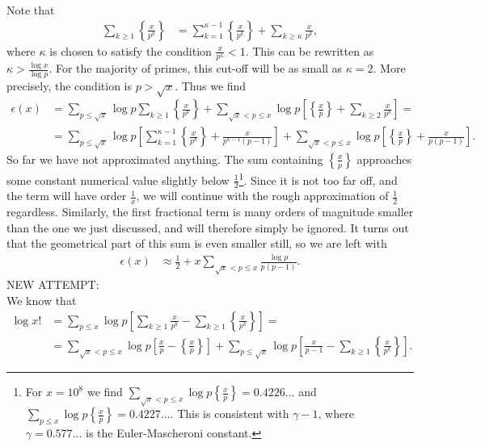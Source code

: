 \documentclass[english, parskip=full]{scrartcl}
\newcommand{\klam}{}
\newcommand{\klammer}{}
\begin{document}
Note that
\begin{align}
\sum_{k\ge 1} \klammer\left\{ \frac{x}{p^k} \right\} &= \sum_{k = 1}^{\kappa-1} \klammer\left\{ \frac{x}{p^k} \right\} + \sum_{k\ge \kappa} \frac{x}{p^k},
\end{align}
where $\kappa$ is chosen to satisfy the condition $\frac{x}{p^\kappa} < 1$.
This can be rewritten as $\kappa > \frac{\log x}{\log p}$.
For the majority of primes, this cut-off will be as small as $\kappa=2$.
More precisely, the condition is $p > \sqrt{x}$.
Thus we find
\begin{align}
\epsilon(x) &= \sum_{p\le \sqrt{x}} \log p \sum_{k\ge 1} \klammer\left\{ \frac{x}{p^k} \right\} + \sum_{\sqrt{x} < p \le x} \log p \klam\left[ \klammer\left\{ \frac{x}{p} \right\} + \sum_{k\ge 2} \frac{x}{p^k} \right] = \\
&= \sum_{p\le \sqrt{x}} \log p \klam\left[ \sum_{k=1}^{\kappa-1} \klammer\left\{ \frac{x}{p^k} \right\} + \frac{x}{p^{\kappa-1}(p-1)} \right] + \sum_{\sqrt{x} < p \le x} \log p\klam\left[ \klammer\left\{ \frac{x}{p} \right\} + \frac{x}{p(p-1)} \right].
\end{align}
So far we have not approximated anything.
The sum containing $\klammer\left\{ \frac{x}{p} \right\}$ approaches some constant numerical value slightly below $\frac{1}{2}$\footnote{For $x=10^8$ we find $\sum_{\sqrt{x} < p \le x} \log p\klammer\left\{ \frac{x}{p} \right\} = 0.4226...$ and $\sum_{p \le x} \log p \klammer\left\{ \frac{x}{p} \right\} = 0.4227...$. 
This is consistent with $\gamma - 1$, where $\gamma = 0.577...$ is the Euler-Mascheroni constant.%
}.
Since it is not too far off, and the term will have order $\frac{1}{x}$, we will continue with the rough approximation of $\frac{1}{2}$ regardless.
Similarly, the first fractional term is many orders of magnitude smaller than the one we just discussed, and will therefore simply be ignored.
It turns out that the geometrical part of this sum is even smaller still, so we are left with
\begin{align}
\epsilon(x) &\approx \frac{1}{2} + x \sum_{\sqrt{x} < p \le x} \frac{\log p}{p(p-1)}.
\end{align}
NEW ATTEMPT:
\\
We know that
\begin{align}
\log x! &= \sum_{p\le x} \log p\klam\left[ \sum_{k\ge 1} \frac{x}{p^k} - \sum_{k\ge 1} \left\{ \frac{x}{p^k} \right\} \right] = \\
&= \sum_{\sqrt{x} < p\le x} \log p\klam\left[ \frac{x}{p} - \left\{ \frac{x}{p} \right\} \right] + \sum_{p\le \sqrt{x}} \log p\klam\left[ \frac{x}{p-1} - \sum_{k\ge 1} \left\{ \frac{x}{p^k} \right\} \right]. %
\end{align}
\end{document}
